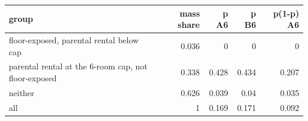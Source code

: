 \begin{tabular}{lrrrr}
\toprule
group & mass share & p A6 & p B6 & p(1-p) A6 \\
\midrule
floor-exposed, parental rental below cap & 0.036 & 0 & 0 & 0 \\
parental rental at the 6-room cap, not floor-exposed & 0.338 & 0.428 & 0.434 & 0.207 \\
neither & 0.626 & 0.039 & 0.04 & 0.035 \\
all & 1 & 0.169 & 0.171 & 0.092 \\
\bottomrule
\end{tabular}
